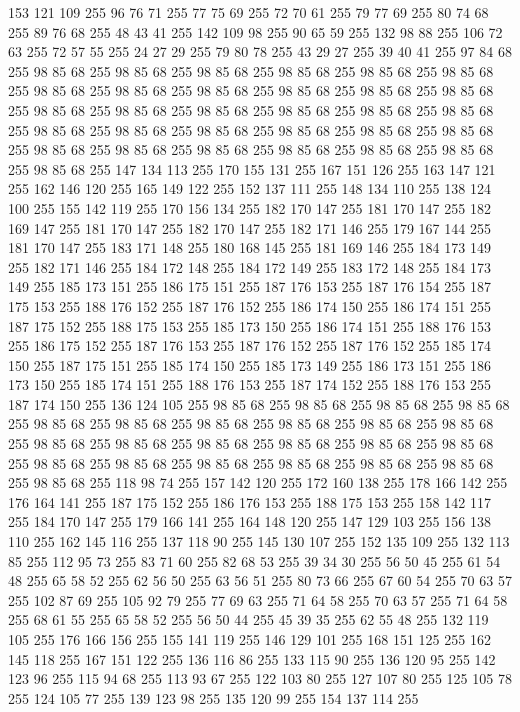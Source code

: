 153 121 109 255 96 76 71 255 77 75 69 255 72 70 61 255 79 77 69 255 80 74 68 255 89 76 68 255 48 43 41 255 142 109 98 255 90 65 59 255 132 98 88 255 106 72 63 255 72 57 55 255 24 27 29 255 79 80 78 255 43 29 27 255 39 40 41 255 97 84 68 255 98 85 68 255 98 85 68 255 98 85 68 255 98 85 68 255 98 85 68 255 98 85 68 255 98 85 68 255 98 85 68 255 98 85 68 255 98 85 68 255 98 85 68 255 98 85 68 255 98 85 68 255 98 85 68 255 98 85 68 255 98 85 68 255 98 85 68 255 98 85 68 255 98 85 68 255 98 85 68 255 98 85 68 255 98 85 68 255 98 85 68 255 98 85 68 255 98 85 68 255 98 85 68 255 98 85 68 255 98 85 68 255 98 85 68 255 98 85 68 255 98 85 68 255 147 134 113 255 170 155 131 255 167 151 126 255 163 147 121 255 162 146 120 255 165 149 122 255 152 137 111 255 148 134 110 255 138 124 100 255 155 142 119 255 170 156 134 255 182 170 147 255 181 170 147 255 182 169 147 255 181 170 147 255
182 170 147 255 182 171 146 255 179 167 144 255 181 170 147 255 183 171 148 255 180 168 145 255 181 169 146 255 184 173 149 255 182 171 146 255 184 172 148 255 184 172 149 255 183 172 148 255 184 173 149 255 185 173 151 255 186 175 151 255 187 176 153 255 187 176 154 255 187 175 153 255 188 176 152 255 187 176 152 255 186 174 150 255 186 174 151 255 187 175 152 255 188 175 153 255 185 173 150 255 186 174 151 255 188 176 153 255 186 175 152 255 187 176 153 255 187 176 152 255 187 176 152 255 185 174 150 255 187 175 151 255 185 174 150 255 185 173 149 255 186 173 151 255 186 173 150 255 185 174 151 255 188 176 153 255 187 174 152 255 188 176 153 255 187 174 150 255 136 124 105 255 98 85 68 255 98 85 68 255 98 85 68 255 98 85 68 255 98 85 68 255 98 85 68 255 98 85 68 255 98 85 68 255 98 85 68 255 98 85 68 255 98 85 68 255 98 85 68 255 98 85 68 255 98 85 68 255 98 85 68 255 98 85 68 255 98 85 68 255 98 85 68 255 98 85 68 255 98 85 68 255 98 85 68 255
98 85 68 255 98 85 68 255 118 98 74 255 157 142 120 255 172 160 138 255 178 166 142 255 176 164 141 255 187 175 152 255 186 176 153 255 188 175 153 255 158 142 117 255 184 170 147 255 179 166 141 255 164 148 120 255 147 129 103 255 156 138 110 255 162 145 116 255 137 118 90 255 145 130 107 255 152 135 109 255 132 113 85 255 112 95 73 255 83 71 60 255 82 68 53 255 39 34 30 255 56 50 45 255 61 54 48 255 65 58 52 255 62 56 50 255 63 56 51 255 80 73 66 255 67 60 54 255 70 63 57 255 102 87 69 255 105 92 79 255 77 69 63 255 71 64 58 255 70 63 57 255 71 64 58 255 68 61 55 255 65 58 52 255 56 50 44 255 45 39 35 255 62 55 48 255 132 119 105 255 176 166 156 255 155 141 119 255 146 129 101 255 168 151 125 255 162 145 118 255 167 151 122 255 136 116 86 255 133 115 90 255 136 120 95 255 142 123 96 255 115 94 68 255 113 93 67 255 122 103 80 255 127 107 80 255 125 105 78 255 124 105 77 255 139 123 98 255 135 120 99 255 154 137 114 255
